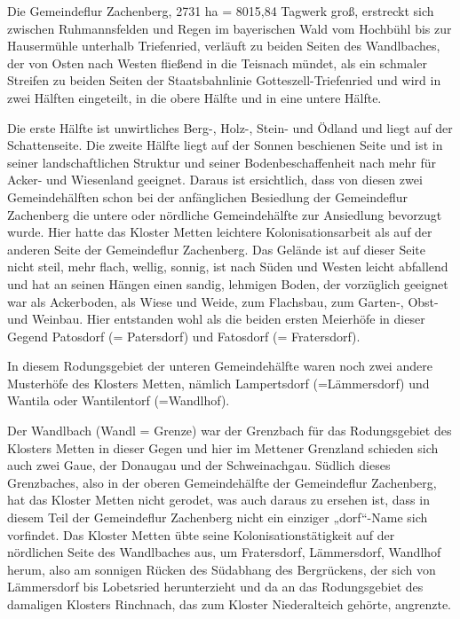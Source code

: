 \documentclass{book}
\begin{document}
Die Gemeindeflur Zachenberg, 2731 ha = 8015,84 Tagwerk groß, erstreckt
sich zwischen Ruhmannsfelden und Regen im bayerischen Wald vom Hochbühl
bis zur Hausermühle unterhalb Triefenried, verläuft zu beiden Seiten des
Wandlbaches, der von Osten nach Westen fließend in die Teisnach mündet,
als ein schmaler Streifen zu beiden Seiten der Staatsbahnlinie
Gotteszell-Triefenried und wird in zwei Hälften eingeteilt, in die obere
Hälfte und in eine untere Hälfte.

Die erste Hälfte ist unwirtliches Berg-, Holz-, Stein- und Ödland und
liegt auf der Schattenseite. Die zweite Hälfte liegt auf der Sonnen
beschienen Seite und ist in seiner landschaftlichen Struktur und seiner
Bodenbeschaffenheit nach mehr für Acker- und Wiesenland geeignet. Daraus
ist ersichtlich, dass von diesen zwei Gemeindehälften schon bei der
anfänglichen Besiedlung der Gemeindeflur Zachenberg die untere oder
nördliche Gemeindehälfte zur Ansiedlung bevorzugt wurde. Hier hatte das
Kloster Metten leichtere Kolonisationsarbeit als auf der anderen Seite
der Gemeindeflur Zachenberg. Das Gelände ist auf dieser Seite nicht
steil, mehr flach, wellig, sonnig, ist nach Süden und Westen leicht
abfallend und hat an seinen Hängen einen sandig, lehmigen Boden, der
vorzüglich geeignet war als Ackerboden, als Wiese und Weide, zum
Flachsbau, zum Garten-, Obst- und Weinbau. Hier entstanden wohl als die
beiden ersten Meierhöfe in dieser Gegend Patosdorf (= Patersdorf) und
Fatosdorf (= Fratersdorf).

In diesem Rodungsgebiet der unteren Gemeindehälfte waren noch zwei
andere Musterhöfe des Klosters Metten, nämlich Lampertsdorf
(=Lämmersdorf) und Wantila oder Wantilentorf (=Wandlhof).

Der Wandlbach (Wandl = Grenze) war der Grenzbach für das Rodungsgebiet
des Klosters Metten in dieser Gegen und hier im Mettener Grenzland
schieden sich auch zwei Gaue, der Donaugau und der Schweinachgau.
Südlich dieses Grenzbaches, also in der oberen Gemeindehälfte der
Gemeindeflur Zachenberg, hat das Kloster Metten nicht gerodet, was auch
daraus zu ersehen ist, dass in diesem Teil der Gemeindeflur Zachenberg
nicht ein einziger „dorf“-Name sich vorfindet. Das Kloster Metten übte
seine Kolonisationstätigkeit auf der nördlichen Seite des Wandlbaches
aus, um Fratersdorf, Lämmersdorf, Wandlhof herum, also am sonnigen
Rücken des Südabhang des Bergrückens, der sich von Lämmersdorf bis
Lobetsried herunterzieht und da an das Rodungsgebiet des damaligen
Klosters Rinchnach, das zum Kloster Niederalteich gehörte, angrenzte.
\end{document}
